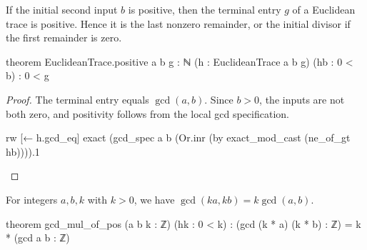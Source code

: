 \begin{corollary} \label{nt:thm:euclidean-positive}
  If the initial second input $b$ is positive, then the terminal entry $g$ of a Euclidean trace is positive. Hence it is the last nonzero remainder, or the initial divisor if the first remainder is zero.

  \begin{lean}
    theorem EuclideanTrace.positive {a b g : ℕ} (h : EuclideanTrace a b g)
        (hb : 0 < b) : 0 < g
  \end{lean}
\end{corollary}

\begin{proof}

  The terminal entry equals $\gcd(a,b)$. Since $b>0$, the inputs are not both zero, and positivity follows from the local gcd specification.

  \begin{lean}
    rw [← h.gcd_eq]
    exact (gcd_spec a b (Or.inr (by exact_mod_cast (ne_of_gt hb)))).1
  \end{lean}

\end{proof}

\begin{theorem} \label{nt:thm:gcd-positive-factor}
  For integers $a,b,k$ with $k>0$, we have $\gcd(ka,kb)=k\gcd(a,b)$.

  \begin{lean}
    theorem gcd_mul_of_pos (a b k : ℤ) (hk : 0 < k) :
        (gcd (k * a) (k * b) : ℤ) = k * (gcd a b : ℤ)
  \end{lean}
\end{theorem}

